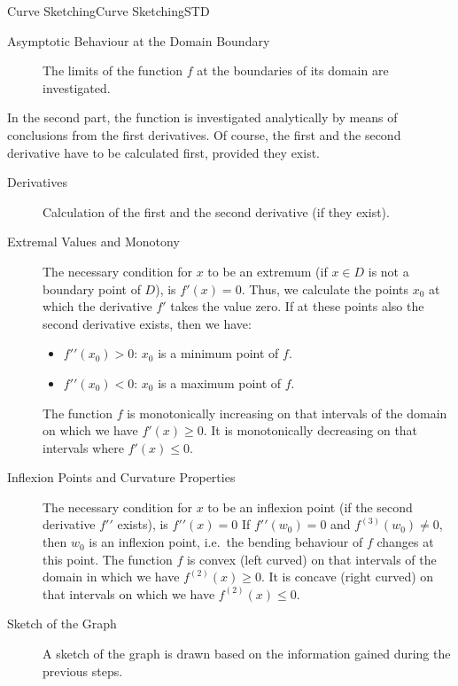 \begin{MXContent}{Curve Sketching}{Curve Sketching}{STD}
\begin{description}
\item[Asymptotic Behaviour at the Domain Boundary]
The limits of the function $f$ at the boundaries of its domain are investigated.
\end{description} 

In the second part, the function is investigated analytically by means of conclusions 
from the first derivatives. Of course, the first and the second derivative have to be 
calculated first, provided they exist.
\begin{description}
\item[Derivatives]

Calculation of the first and the second derivative (if they exist).

\item[Extremal Values and Monotony]

The necessary condition for $x$ to be an extremum (if $x \in D$ is not a boundary point of $D$), is $f'(x) = 0$.\newline
Thus, we calculate the points $x_0$ at which the derivative $f'$ takes the value zero. If at these points also 
the second derivative exists, then we have:
\begin{itemize}
 \item ${f'}'(x_0) > 0$: $x_0$ is a minimum point of $f$.
 \item ${f'}'(x_0) < 0$: $x_0$ is a maximum point of $f$.
\end{itemize}
The function $f$ is monotonically increasing on that intervals of the domain 
on which we have $f'(x) \geq 0$. It is monotonically decreasing on that intervals
where $f'(x) \leq 0$.

\item[Inflexion Points and Curvature Properties]
The necessary condition for $x$ to be an inflexion point (if the second derivative ${f'}'$ exists), is ${f'}'(x) = 0$\newline
If ${f'}'(w_0) = 0$ and $f^{(3)}(w_0) \neq 0$, then $w_0$ is an inflexion point, i.e.\ the bending behaviour of $f$ changes at this 
point.\newline
The function $f$ is convex (left curved) on that intervals of the domain in which we have $f^{(2)}(x) \geq 0$. It is 
concave (right curved) on that intervals on which we have $f^{(2)}(x) \leq 0$.


\item[Sketch of the Graph] A sketch of the graph is drawn based on the information gained during 
the previous steps.
\end{description}


\end{MXContent}
